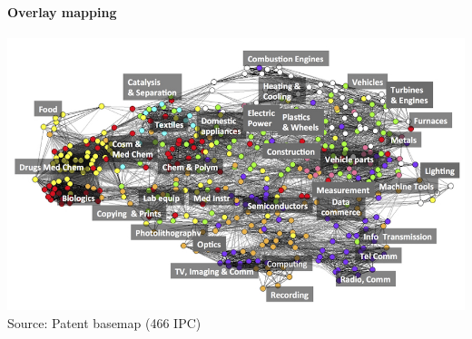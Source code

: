\documentclass[8pt]{beamer}
\begin{document}
\begin{frame}
\frametitle{\insertsection}
\framesubtitle{Overlay mapping}

\centering
\includegraphics[width=\linewidth,height=0.75\textheight,keepaspectratio]{patent_map}\\
\tiny{Source: Patent basemap (466 IPC)  \cite{Kay2014}}

\end{frame}

\end{document}
